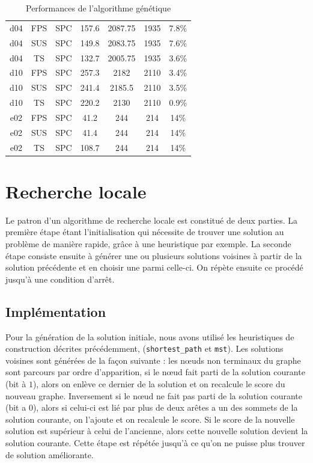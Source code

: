 \documentclass[10pt]{article}
\begin{document}
\begin{table}[h!]
\begin{tabular}{|c|c|c|c|c|c|c|}
\hline
d04 & FPS & SPC & 157.6 & 2087.75 & 1935 & 7.8\% \\
d04 & SUS & SPC & 149.8 & 2083.75 & 1935 & 7.6\% \\
\rowcolor{yellow!60} d04 & TS & SPC & 132.7 & 2005.75 & 1935 & 3.6\% \\
\hline
d10 & FPS & SPC & 257.3 & 2182 & 2110 & 3.4\% \\
d10 & SUS & SPC & 241.4 & 2185.5 & 2110 & 3.5\% \\
\rowcolor{yellow!60} d10 & TS & SPC & 220.2 & 2130 & 2110 & 0.9\% \\
\hline
e02 & FPS & SPC & 41.2 & 244 & 214 & 14\% \\
e02 & SUS & SPC & 41.4 & 244 & 214 & 14\% \\
e02 & TS & SPC & 108.7 & 244 & 214 & 14\% \\
\hline
		\end{tabular}
		\caption{Performances de l'algorithme génétique}
		\label{tab-perfgen}
	\end{table}
	
	
	
	
\section{Recherche locale}

Le patron d'un algorithme de recherche locale est constitué de deux parties. La première étape étant l'initialisation qui nécessite de trouver une solution au problème de manière rapide, grâce à une heuristique par exemple. La seconde étape consiste ensuite à générer une ou plusieurs solutions voisines à partir de la solution précédente et en choisir une parmi celle-ci. On répète ensuite ce procédé jusqu'à une condition d'arrêt.

\subsection{Implémentation}
Pour la génération de la solution initiale, nous avons utilisé les heuristiques de construction décrites précédemment, (\texttt{shortest\_path} et \texttt{mst}). Les solutions voisines sont générées de la façon suivante : les nœuds non terminaux du graphe sont parcours par ordre d'apparition, si le nœud fait parti de la solution courante (bit à $1$), alors on enlève ce dernier de la solution et on recalcule le score du nouveau graphe. Inversement si le nœud ne fait pas parti de la solution courante (bit a $0$), alors si celui-ci est lié par plus de deux arêtes a un des sommets de la solution courante, on l'ajoute et on recalcule le score.
    Si le score de la nouvelle solution est supérieur à celui de l'ancienne, alors cette nouvelle solution devient la solution courante. Cette étape est répétée jusqu'à ce qu'on ne puisse plus trouver de solution améliorante.
    
\end{document}
